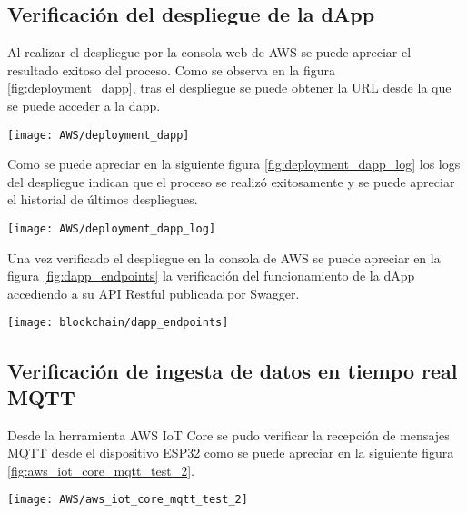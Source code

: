 \subsection{Verificación del despliegue de la dApp}

Al realizar el despliegue por la consola web de AWS se puede apreciar el resultado exitoso del proceso. Como se observa en la figura \ref{fig:deployment_dapp}, tras el despliegue se puede obtener la URL desde la que se puede acceder a la dapp.

\begin{center}
   \texttt{[image: AWS/deployment\_dapp]}
   \label{fig:deployment_dapp}
\end{center}

Como se puede apreciar en la siguiente figura \ref{fig:deployment_dapp_log} los logs del despliegue indican que el proceso se realizó exitosamente y se puede apreciar el historial de últimos despliegues.

\begin{center}
   \texttt{[image: AWS/deployment\_dapp\_log]}
   \label{fig:deployment_dapp_log}
\end{center}

Una vez verificado el despliegue en la consola de AWS se puede apreciar en la figura \ref{fig:dapp_endpoints} la verificación del funcionamiento de la dApp accediendo a su API Restful publicada por Swagger.


\begin{center}
   \texttt{[image: blockchain/dapp\_endpoints]}
   \label{fig:dapp_endpoints}
\end{center}


\subsection{Verificación de ingesta de datos en tiempo real MQTT}

Desde la herramienta AWS IoT Core se pudo verificar la recepción de mensajes MQTT desde el dispositivo ESP32 como se puede apreciar en la siguiente figura \ref{fig:aws_iot_core_mqtt_test_2}.

\begin{center}
   \texttt{[image: AWS/aws\_iot\_core\_mqtt\_test\_2]}
   \label{fig:aws_iot_core_mqtt_test_2}
\end{center}


